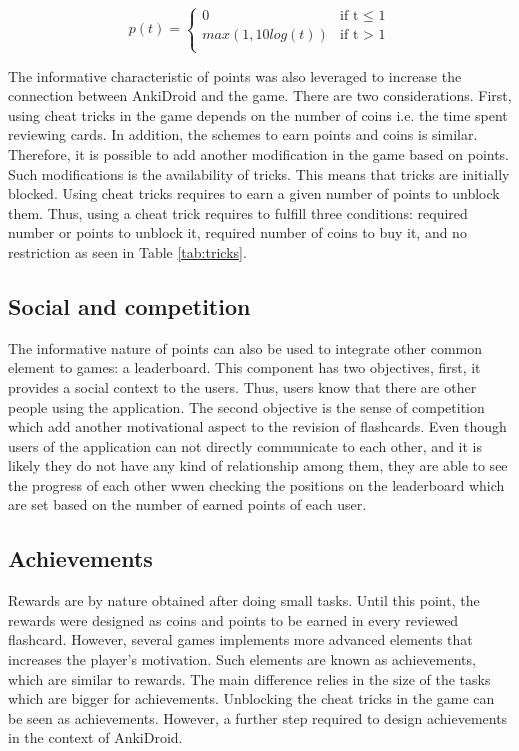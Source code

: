 \begin{equation}
	p(t) =
  		\begin{cases}
  			0 & \text{if t $\leq$ 1}\\
  			max(1, 10log(t)) & \text{if t $>$ 1}\\
  		\end{cases}
  	\label{eq:points-formula}
\end{equation}

The informative characteristic of points was also leveraged to increase the connection between AnkiDroid and the game. There are two considerations. First, using cheat tricks in the game depends on the number of coins i.e. the time spent reviewing cards. In addition, the schemes to earn points and coins is similar. Therefore, it is possible to add another modification in the game based on points. Such modifications is the availability of tricks. This means that tricks are initially blocked. Using cheat tricks requires to earn a given number of points to unblock them. Thus, using a cheat trick requires to fulfill three conditions: required number or points to unblock it, required number of coins to buy it, and no restriction as seen in Table \ref{tab:tricks}.

\subsection{Social and competition}
The informative nature of points can also be used to integrate other common element to games: a leaderboard. This component has two objectives, first, it provides a social context to the users. Thus, users know that there are other people using the application. The second objective is the sense of competition which add another motivational aspect to the revision of flashcards. Even though users of the application can not directly communicate to each other, and it is likely they do not have any kind of relationship among them, they are able to see the progress of each other wwen checking the positions on the leaderboard which are set based on the number of earned points of each user.

\subsection{Achievements}
Rewards are by nature obtained after doing small tasks. Until this point, the rewards were designed as coins and points to be earned in every reviewed flashcard. However, several games implements more advanced elements that increases the player's motivation. Such elements are known as achievements, which are similar to rewards. The main difference relies in the size of the tasks which are bigger for achievements. Unblocking the cheat tricks in the game can be seen as achievements. However, a further step required to design achievements in the context of AnkiDroid.


